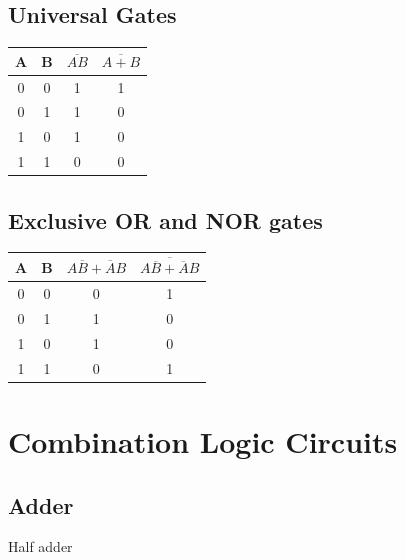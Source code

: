\documentclass[journal,12pt,twocolumn]{IEEEtran}
\begin{document}
\subsection{Universal Gates}
\begin{table}[h!]
\centering
\begin{tabular}{|cc|c|c|}
\hline
A	&	B	&	    	$\overline{AB}$	&	$\overline{A + B}$	\\ \hline
0	&	0	&		    1    	&	1 \\ \hline
0	&	1	&			1		&	0 \\\hline
1	&	0	&			1		&	0 \\\hline
1	&	1	&			0		&	0 \\\hline	

\end{tabular}
\end{table}

\subsection{Exclusive OR and NOR gates}
\begin{table}[h!]
\centering
\begin{tabular}{|cc|c|c|}
\hline
A	&	B	&	     $A\overline{B} + \overline{A}B$	&	$\overline{A\overline{B} + \overline{A}B}$	\\ \hline
0	&	0	&		    0    	&	1 \\ \hline
0	&	1	&			1		&	0 \\\hline
1	&	0	&			1		&	0 \\\hline
1	&	1	&			0		&	1 \\\hline	

\end{tabular}
\end{table}


\section{Combination Logic Circuits}
\subsection{Adder}
\problem Half adder
\end{document}
